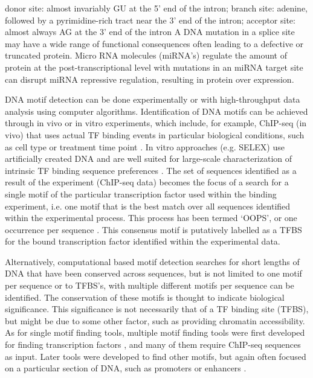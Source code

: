 \documentclass[12pt, onecolumn, oneside]{gsajnl}
\begin{document}
donor site: almost invariably GU at the 5' end of the intron;
branch site: adenine, followed by a pyrimidine-rich tract near the 3' end of the intron; acceptor site: almost always AG at the 3' end of the intron
A DNA mutation in a splice site may have a wide range of functional consequences often leading to
a defective or truncated protein.  Micro RNA molecules (miRNA's) regulate the amount of protein at the post-transcriptional level with mutations in an miRNA target site can disrupt miRNA repressive regulation, resulting in protein over expression.

DNA motif detection can be done experimentally or with high-throughput data analysis using computer algorithms. Identification of DNA motifs can be achieved through in vivo or in vitro experiments, which include, for example, ChIP-seq (in vivo) that uses actual TF binding events in particular biological conditions, such as cell type or treatment time point \citep{inukai2017transcription}. In vitro approaches (e.g. SELEX) use artificially created DNA and are well suited for large-scale characterization of intrinsic TF binding sequence preferences \citep{inukai2017transcription}.  The set of sequences identified as a result of the experiment (ChIP-seq data) becomes the focus of a search for a single motif of the particular transcription factor used within the binding experiment, i.e. one motif that is the best match over all sequences identified within the experimental process. This process has been termed `OOPS', or one occurrence per sequence \citep{zhang2016entropy}. This consensus motif is putatively labelled as a TFBS for the bound transcription factor identified within the experimental data. 

Alternatively, computational based motif detection searches for short lengths of DNA that have been conserved across sequences, but is not limited to one motif per sequence or to TFBS's, with multiple different motifs per
sequence can be identified. The conservation of these motifs is thought to indicate biological significance. This significance is not necessarily that of a TF binding site (TFBS), but might be due to some other factor, such as providing chromatin accessibility.
As for single motif finding tools, multiple motif finding tools were first developed for finding transcription factors \citet{dassi2016dynamit}, and many of them require ChIP-seq sequences as input. Later tools were developed to find other motifs, but again often focused on a particular section of DNA, such as promoters or enhancers  \citep{boeva2016analysis}.
\end{document}
